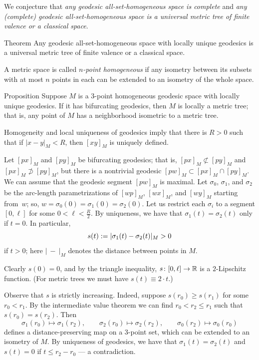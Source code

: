 \documentclass[leqno,a4paper,10pt]{article}
\begin{document}
We conjecture that \emph{any geodesic all-set-homogeneous space is complete} and
\emph{any (complete) geodesic all-set-homogeneous space is a universal metric tree of finite valence or a classical space}.

\begin{thm}{Theorem}
Any geodesic all-set-homogeneous space with locally unique geodesics is a universal metric tree of finite valence or a classical space.
\end{thm}

A metric space is called \emph{$n$-point homogeneous}
if any isometry between its subsets with at most $n$ points in each can be extended to an isometry of the whole space.

\begin{thm}{Proposition}
Suppose $M$ is a 3-point homogeneous geodesic space with locally unique geodesics.
If it has bifurcating geodesics, then $M$ is locally a metric tree;
that is, any point of $M$ has a neighborhood isometric to a metric tree.
\end{thm}

Homogeneity and local uniqueness of geodesics imply that there is $R>0$ such that if $|x-y|_M<R$, then $[xy]_M$ is uniquely defined.

Let $[px]_M$ and $[py]_M$ be bifurcating geodesics;
that is, $[px]_M\not\subset[py]_M$ and $[px]_M\not\supset[py]_M$, but there is a nontrivial geodesic $[pw]_M\subset [px]_M\cap[py]_M$.
We can assume that the geodesic segment $[pw]_M$ is maximal.
Let $\sigma_0$, $\sigma_1$, and $\sigma_2$ be the arc-length parametrizations of $[wp]_M$, $[wx]_M$, and $[wy]_M$ starting from~$w$; so, $w=\sigma_0(0)=\sigma_1(0)=\sigma_2(0)$.
Let us restrict each $\sigma_i$ to a segment $[0,\ell]$ for some $0<\ell<\tfrac R2$.
By uniqueness, we have that $\sigma_1(t)=\sigma_2(t)$ only if $t=0$.
In particular,
\[s(t)\mathrel{{:}{=}}|\sigma_1(t)-\sigma_2(t)|_M>0\]
if $t>0$; here $|\ -\ |_M$ denotes the distance between points in $M$.

Clearly $s(0)=0$, and by the triangle inequality, $s\colon[0,\ell]\to\mathbb{R}$ is a $2$-Lipschitz function.
(For metric trees we must have $s(t)\equiv2\cdot t$.)

Observe that $s$ is strictly increasing.
Indeed, suppose $s(r_0)\ge s(r_1)$ for some $r_0<r_1$.
By the intermediate value theorem we can find $r_0<r_2\le r_1$ such that $s(r_0)=s(r_2)$.
Then
\[\sigma_1(r_0)\mapsto\sigma_1(r_2),
\qquad
\sigma_2(r_0)\mapsto\sigma_2(r_2),
\qquad
\sigma_0(r_2)\mapsto\sigma_0(r_0)\]
defines a distance-preserving map on a 3-point set,
which can be extended to an isometry of $M$.
By uniqueness of geodesics, we have that $\sigma_1(t)=\sigma_2(t)$ and $s(t)=0$ if $t\le r_2-r_0$ --- a contradiction.
\end{document}
